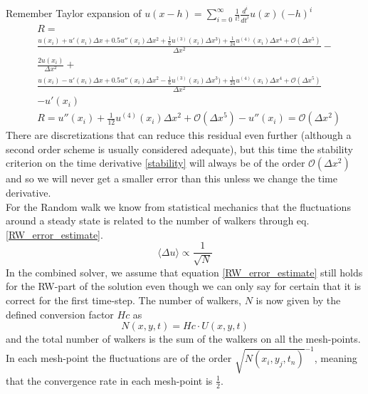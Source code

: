 Remember Taylor expansion of $u(x-h) = \sum\limits_{i=0}^\infty\frac{1}{i!}\frac{d^i}{dt^i}u(x)(-h)^i$
\begin{align*}
 &R =\\& \frac{u(x_i)+u'(x_i)\Delta x +0.5u''(x_i)\Delta x^2 + \frac{1}{6}u^{(3)}(x_i)\Delta x^3) +\frac{1}{24}u^{(4)}(x_i)\Delta x^4 +\mathcal{O}(\Delta x^5)}{\Delta x^2}-\\ &\frac{2u(x_i)}{\Delta x^2}+\\
 &\frac{u(x_i)-u'(x_i)\Delta x +0.5u''(x_i)\Delta x^2 - \frac{1}{6}u^{(3)}(x_i)\Delta x^3) +\frac{1}{24}u^{(4)}(x_i)\Delta x^4 +\mathcal{O}(\Delta x^5)}{\Delta x^2} \\ &-u'(x_i)\\
&R = u''(x_i) +\frac{1}{12}u^{(4)}(x_i)\Delta x^2 + \mathcal{O}(\Delta x^5)  -u''(x_i) = \mathcal{O}(\Delta x^2) 
\end{align*}
There are discretizations that can reduce this residual even further (although a second order scheme is usually considered adequate), but this time the stability criterion on the time derivative \ref{stability} will always be of the order $\mathcal{O}(\Delta x^2)$ and so we will never get a smaller error than this unless we change the time derivative. \\
For the Random walk we know from statistical mechanics that the fluctuations around a steady state is related to the number of walkers through eq. \ref{RW_error_estimate}.
\begin{equation}\label{RW_error_estimate}
 \langle\Delta u\rangle \propto \frac{1}{\sqrt{N}}
\end{equation}
In the combined solver, we assume that equation \ref{RW_error_estimate} still holds for the RW-part of the solution even though we can only say for certain that it is correct for the first time-step. 
The number of walkers, $N$ is now given by the defined conversion factor $Hc$ as 
\begin{equation}
 N(x,y,t) = Hc\cdot U(x,y,t)
\end{equation}
and the total number of walkers is the sum of the walkers on all the mesh-points. 
In each mesh-point the fluctuations are of the order $\sqrt{N(x_i,y_j,t_n)}^{-1}$, meaning that the convergence rate in each mesh-point is $\frac{1}{2}$. 

